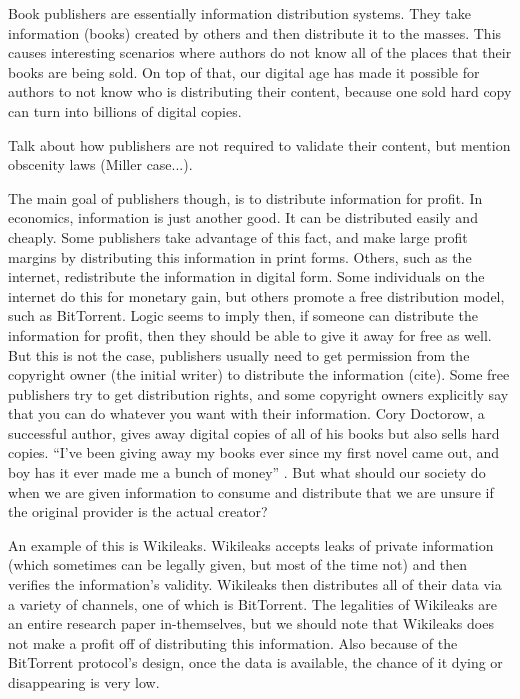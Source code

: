 \documentclass[11pt]{article}
\begin{document}
Book publishers are essentially information distribution systems. They take information (books) created by others and then distribute it to the masses. This causes interesting scenarios where authors do not know all of the places that their books are being sold. On top of that, our digital age has made it possible for authors to not know who is distributing their content, because one sold hard copy can turn into billions of digital copies.

Talk about how publishers are not required to validate their content, but mention obscenity laws (Miller case...).

The main goal of publishers though, is to distribute information for profit. In economics, information is just another good. It can be distributed easily and cheaply. Some publishers take advantage of this fact, and make large profit margins\cite{PSO} by distributing this information in print forms. Others, such as the internet, redistribute the information in digital form. Some individuals on the internet do this for monetary gain, but others promote a free distribution model, such as BitTorrent. Logic seems to imply then, if someone can distribute the information for profit, then they should be able to give it away for free as well. But this is not the case, publishers usually need to get permission from the copyright owner (the initial writer) to distribute the information (cite). Some free publishers try to get distribution rights, and some copyright owners explicitly say that you can do whatever you want with their information. Cory Doctorow, a successful author, gives away digital copies of all of his books but also sells hard copies. ``I've been giving away my books ever since my first novel came out, and boy has it ever made me a bunch of money'' \cite{doctorow}. But what should our society do when we are given information to consume and distribute that we are unsure if the original provider is the actual creator?

An example of this is Wikileaks. Wikileaks accepts leaks of private information (which sometimes can be legally given, but most of the time not) and then verifies the information's validity. Wikileaks then distributes all of their data via a variety of channels, one of which is BitTorrent. The legalities of Wikileaks are an entire research paper in-themselves, but we should note that Wikileaks does not make a profit off of distributing this information. Also because of the BitTorrent protocol's design, once the data is available, the chance of it dying or disappearing is very low.
\end{document}
